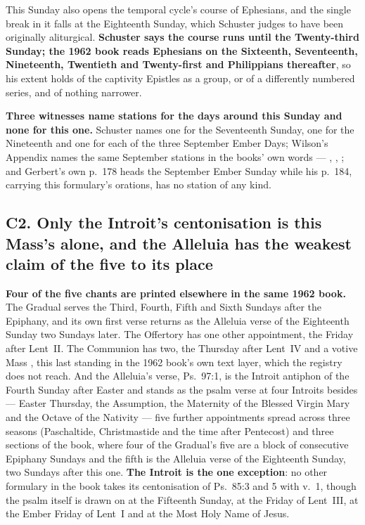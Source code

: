 This Sunday also opens the temporal cycle's course of Ephesians, and the single
break in it falls at the Eighteenth Sunday, which Schuster judges to have been
originally aliturgical. \textbf{Schuster says the course runs until the
Twenty-third Sunday; the 1962 book reads Ephesians on the Sixteenth,
Seventeenth, Nineteenth, Twentieth and Twenty-first and Philippians thereafter},
so his extent holds of the captivity Epistles as a group, or of a differently
numbered series, and of nothing narrower.

\textbf{Three witnesses name stations for the days around this Sunday and none
for this one.} Schuster names one for the Seventeenth Sunday, one for the
Nineteenth and one for each of the three September Ember Days; Wilson's Appendix
names the same September stations in the books' own words --- , , ; and Gerbert's own p.~178
heads the September Ember Sunday  while his p.~184,
carrying this formulary's orations, has no station of any kind.

\subsection*{C2. Only the Introit's centonisation is this Mass's alone, and the Alleluia has the weakest claim of the five to its place}

\textbf{Four of the five chants are printed elsewhere in the same 1962 book.}
The Gradual serves the Third, Fourth, Fifth and Sixth Sundays after the
Epiphany, and its own first verse returns as the Alleluia verse of the
Eighteenth Sunday two Sundays later. The Offertory has one other appointment,
the Friday after Lent~II. The Communion has two, the Thursday after Lent~IV and
a votive Mass , this last standing in the 1962
book's own text layer, which the registry does not reach. And the Alleluia's
verse, Ps.~97:1, is the Introit antiphon of the Fourth Sunday after Easter and
stands as the psalm verse at four Introits besides --- Easter Thursday, the
Assumption, the Maternity of the Blessed Virgin Mary and the Octave of the
Nativity --- five further appointments spread across three seasons
(Paschaltide, Christmastide and the time after Pentecost) and three
sections of the book, where four of the Gradual's five are a block of
consecutive Epiphany Sundays and the fifth is the Alleluia verse of the
Eighteenth Sunday, two Sundays after this one. \textbf{The Introit is the one
exception}: no other formulary in the book takes its centonisation of Ps.~85:3
and 5 with v.~1, though the psalm itself is drawn on at the Fifteenth Sunday, at
the Friday of Lent~III, at the Ember Friday of Lent~I and at the Most Holy Name
of Jesus.

